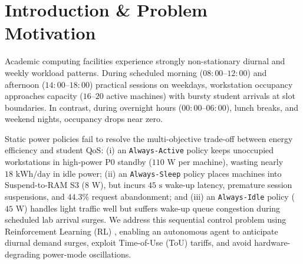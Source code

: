 \documentclass[9pt,twocolumn,a4paper]{extarticle}
\begin{document}
\section{Introduction \& Problem Motivation}
Academic computing facilities experience strongly non-stationary diurnal and weekly workload patterns. During scheduled morning ($08{:}00\text{--}12{:}00$) and afternoon ($14{:}00\text{--}18{:}00$) practical sessions on weekdays, workstation occupancy approaches capacity ($16\text{--}20$ active machines) with bursty student arrivals at slot boundaries. In contrast, during overnight hours ($00{:}00\text{--}06{:}00$), lunch breaks, and weekend nights, occupancy drops near zero.

Static power policies fail to resolve the multi-objective trade-off between energy efficiency and student QoS: (i) an \texttt{Always-Active} policy keeps unoccupied workstations in high-power P0 standby ($110\text{ W}$ per machine), wasting nearly $18\text{ kWh/day}$ in idle power; (ii) an \texttt{Always-Sleep} policy places machines into Suspend-to-RAM S3 ($8\text{ W}$), but incurs $45\text{ s}$ wake-up latency, premature session suspensions, and $44.3\%$ request abandonment; and (iii) an \texttt{Always-Idle} policy ($45\text{ W}$) handles light traffic well but suffers wake-up queue congestion during scheduled lab arrival surges. We address this sequential control problem using Reinforcement Learning (RL) \cite{sutton2018reinforcement,benini1999policy}, enabling an autonomous agent to anticipate diurnal demand surges, exploit Time-of-Use (ToU) tariffs, and avoid hardware-degrading power-mode oscillations.
\end{document}
